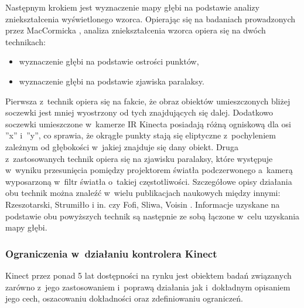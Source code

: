 Następnym krokiem jest wyznaczenie mapy głębi na podstawie analizy zniekształcenia wyświetlonego wzorca. Opierając się na badaniach prowadzonych przez MacCormicka \cite{MacCormick2011}, analiza zniekształcenia wzorca opiera się na dwóch technikach:
		
\begin{itemize}
	\item wyznaczenie głębi na podstawie ostrości punktów,
	\item wyznaczenie głębi na podstawie zjawiska paralaksy.
\end{itemize}
		
Pierwsza z~technik opiera się na fakcie, że obraz obiektów umieszczonych bliżej soczewki jest mniej wyostrzony od tych znajdujących się dalej. Dodatkowo soczewki umieszczone w~kamerze IR Kinecta posiadają różną ogniskową dla osi ''x'' i~''y'', co sprawia, że okrągłe punkty stają się eliptyczne z~pochyleniem zależnym od głębokości w~jakiej znajduje się dany obiekt. Druga z~zastosowanych technik opiera się na zjawisku paralaksy, które występuje w~wyniku przesunięcia pomiędzy projektorem światła podczerwonego a~kamerą wyposarzoną w~filtr światła o~takiej częstotliwości. Szczegółowe opisy działania obu technik można znaleźć w~wielu publikacjach naukowych między innymi: Rzeszotarski, Strumiłło i in. \cite{Rzeszotarski2006} czy Fofi, Sliwa, Voisin \cite{Fofi2004}. Informacje uzyskane na podstawie obu powyższych technik są następnie ze sobą łączone w~celu uzyskania mapy głębi.
		
\subsubsection*{Ograniczenia w~działaniu kontrolera Kinect}\label{ssec:characteristics:kinect:limitation}
		
Kinect przez ponad 5 lat dostępności na rynku jest obiektem badań związanych zarówno z~jego zastosowaniem i~poprawą działania jak i~dokładnym opisaniem jego cech, oszacowaniu dokładności oraz zdefiniowaniu ograniczeń. 
		
